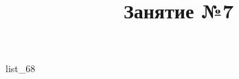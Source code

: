 \documentclass[12pt, a4paper]{article}
\begin{document}
	\title{Занятие №7}
	{list_68}
\end{document}
